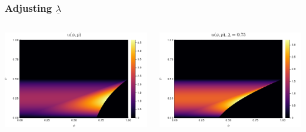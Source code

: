 \documentclass{beamer}
\begin{document}
\begin{frame}
    \frametitle{Adjusting $\underline{\lambda}$}
    \begin{columns}
        \hspace{-1 cm}\begin{column}{0.5\textwidth}
            \includegraphics[scale=0.3]{vanilla.png}
        \end{column}
        \begin{column}{0.5\textwidth}
            \includegraphics[scale=0.3]{high_lambda_bar.png}
        \end{column}
    \end{columns}
\end{frame}
\end{document}
